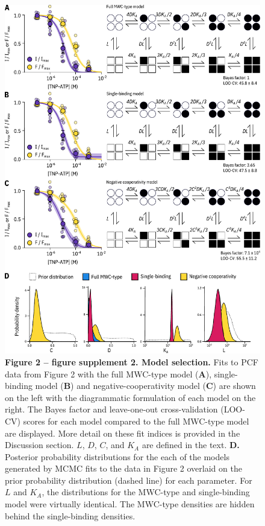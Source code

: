 \documentclass[10pt,lineno, doublespacing]{elife}
\begin{document}
\begin{figure}
\begin{fullwidth}
\centering
\includegraphics[height=0.75\textheight]{figure_two_s2}
\captionsetup{labelformat=empty}
\caption{
\textbf{Figure 2 -- figure supplement 2. Model selection.}
Fits to PCF data from Figure 2 with the full MWC-type model (\textbf{A}), single-binding model (\textbf{B}) and negative-cooperativity model (\textbf{C}) are shown on the left with the diagrammatic formulation of each model on the right.
The Bayes factor and leave-one-out cross-validation (LOO-CV) scores for each model compared to the full MWC-type model are displayed.
More detail on these fit indices is provided in the Discussion section.
$L$, $D$, $C$, and $K_A$ are defined in the text.
\textbf{D.}
Posterior probability distributions for the each of the models generated by MCMC fits to the data in Figure 2 overlaid on the prior probability distribution (dashed line) for each parameter.
For $L$ and $K_A$, the distributions for the MWC-type and single-binding model were virtually identical.
The MWC-type densities are hidden behind the single-binding densities.
}
\label{fig:two_s2}
\end{fullwidth}
\end{figure}
\end{document}
